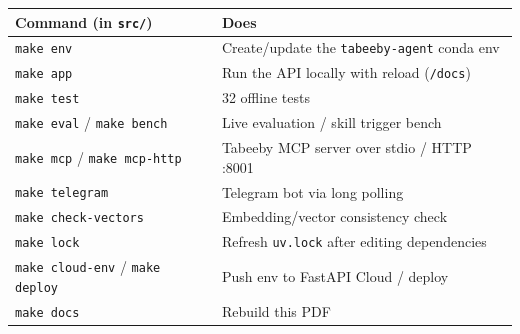 \documentclass[11pt,a4paper]{article}
\newcommand{\code}[1]{\texttt{#1}}
\begin{document}
\begin{center}\small
\begin{tabularx}{\linewidth}{@{}lY@{}}
\toprule
\textbf{Command (in \code{src/})} & \textbf{Does} \\
\midrule
\code{make env} & Create/update the \code{tabeeby-agent} conda env \\
\code{make app} & Run the API locally with reload (\code{/docs}) \\
\code{make test} & 32 offline tests \\
\code{make eval} / \code{make bench} & Live evaluation / skill trigger bench \\
\code{make mcp} / \code{make mcp-http} & Tabeeby MCP server over stdio / HTTP :8001 \\
\code{make telegram} & Telegram bot via long polling \\
\code{make check-vectors} & Embedding/vector consistency check \\
\code{make lock} & Refresh \code{uv.lock} after editing dependencies \\
\code{make cloud-env} / \code{make deploy} & Push env to FastAPI Cloud / deploy \\
\code{make docs} & Rebuild this PDF \\
\bottomrule
\end{tabularx}
\end{center}
\end{document}
